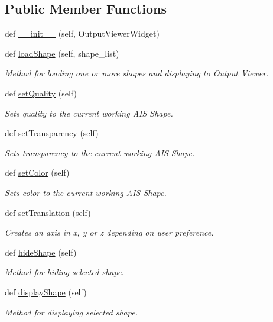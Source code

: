 \subsection*{Public Member Functions}
\begin{DoxyCompactItemize}
\item 
def \hyperlink{classocc__modules_1_1shape__properties_1_1_shape_manager_aeafd1ea7cbe63a409e51e546db403bfd}{\+\_\+\+\_\+init\+\_\+\+\_\+} (self, Output\+Viewer\+Widget)
\item 
def \hyperlink{classocc__modules_1_1shape__properties_1_1_shape_manager_a8833b4dba535cb76318777c031cf08b5}{load\+Shape} (self, shape\+\_\+list)
\begin{DoxyCompactList}\small\item\em Method for loading one or more shapes and displaying to Output Viewer. \end{DoxyCompactList}\item 
def \hyperlink{classocc__modules_1_1shape__properties_1_1_shape_manager_abe8c1dbcfe98b9f86a0560dd1e8b853a}{set\+Quality} (self)
\begin{DoxyCompactList}\small\item\em Sets quality to the current working A\+IS Shape. \end{DoxyCompactList}\item 
def \hyperlink{classocc__modules_1_1shape__properties_1_1_shape_manager_a8d7fdd0bde28afe34d3793c8bcf060fa}{set\+Transparency} (self)
\begin{DoxyCompactList}\small\item\em Sets transparency to the current working A\+IS Shape. \end{DoxyCompactList}\item 
def \hyperlink{classocc__modules_1_1shape__properties_1_1_shape_manager_ac659823f3085963daf751a6a94b366a7}{set\+Color} (self)
\begin{DoxyCompactList}\small\item\em Sets color to the current working A\+IS Shape. \end{DoxyCompactList}\item 
def \hyperlink{classocc__modules_1_1shape__properties_1_1_shape_manager_a1cab1ea26a1cd0091d88106b6b4715bb}{set\+Translation} (self)
\begin{DoxyCompactList}\small\item\em Creates an axis in x, y or z depending on user preference. \end{DoxyCompactList}\item 
def \hyperlink{classocc__modules_1_1shape__properties_1_1_shape_manager_ad4293087adb512ea61fe0c3429c0e08c}{hide\+Shape} (self)
\begin{DoxyCompactList}\small\item\em Method for hiding selected shape. \end{DoxyCompactList}\item 
def \hyperlink{classocc__modules_1_1shape__properties_1_1_shape_manager_aba26c11e7e7ec6c2c6709a27cbeaaf69}{display\+Shape} (self)
\begin{DoxyCompactList}\small\item\em Method for displaying selected shape. \end{DoxyCompactList}\end{DoxyCompactItemize}
